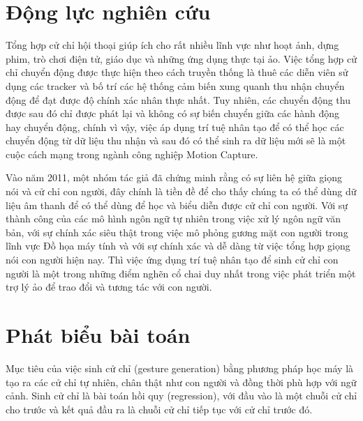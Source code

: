 \section{Động lực nghiên cứu}

Tổng hợp cử chỉ hội thoại giúp ích cho rất nhiều lĩnh vực như hoạt ảnh, dựng phim, trò chơi điện tử, giáo dục và những ứng dụng thực tại ảo. Việc tổng hợp cử chỉ chuyển động được thực hiện theo cách truyền thống là thuê các diễn viên sử dụng các tracker và bố trí các hệ thống cảm biến xung quanh thu nhận chuyển động để đạt được độ chính xác nhân thực nhất. Tuy nhiên, các chuyển động thu được sau đó chỉ được phát lại và không có sự biến chuyển giữa các hành động hay chuyển động, chính vì vậy, việc áp dụng trí tuệ nhân tạo để có thể học các chuyển động từ dữ liệu thu nhận và sau đó có thể sinh ra dữ liệu mới sẽ là một cuộc cách mạng trong ngành công nghiệp Motion Capture.

Vào năm 2011, một nhóm tác giả \cite{bergmann2011relation} đã chứng minh rằng có sự liên hệ giữa giọng nói và cử chỉ con người, đây chính là tiền đề để cho thấy chúng ta có thể dùng dữ liệu âm thanh để có thể dùng để học và biểu diễn được cử chỉ con người.
Với sự thành công của các mô hình ngôn ngữ tự nhiên trong việc xử lý ngôn ngữ văn bản, với sự chính xác siêu thật trong việc mô phỏng gương mặt con người trong lĩnh vực Đồ họa máy tính và với sự chính xác và dễ dàng từ việc tổng hợp giọng nói con người hiện nay. Thì việc ứng dụng trí tuệ nhân tạo để sinh cử chỉ con người là một trong những điểm nghẽn cổ chai duy nhất trong việc phát triển một trợ lý ảo để trao đổi và tương tác với con người.

\section{Phát biểu bài toán}

Mục tiêu của việc sinh cử chỉ (gesture generation) bằng phương pháp học máy là tạo ra các cử chỉ tự nhiên, chân thật như con người và đồng thời phù hợp với ngữ cảnh.
Sinh cử chỉ là bài toán hồi quy (regression), với đầu vào là một chuỗi cử chỉ cho trước và kết quả đầu ra là chuỗi cử chỉ tiếp tục với cử chỉ trước đó.


